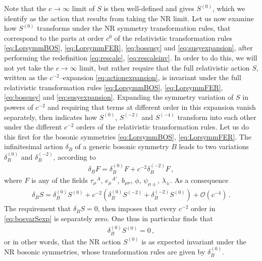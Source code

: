 \documentclass[a4paper,10pt,openany]{article}
\begin{document}
	Note that the $c \rightarrow \infty$ limit of $S$ is then well-defined and gives $S^{(0)}$, which we identify as the action that results from taking the NR limit. Let us now examine how $S^{(0)}$ transforms under the NR symmetry transformation rules, that correspond to the parts at order $c^0$ of the relativistic transformation rules \eqref{eq:LorsymmBOS}, \eqref{eq:LorsymmFER}, \eqref{eq:bossusy} and \eqref{eq:susyexpansion}, after performing the redefinition \eqref{eq:rescale}, \eqref{eq:rescaleinv}. In order to do this, we will not yet take the $c \rightarrow \infty$ limit, but rather require that the full relativistic action $S$, written as the $c^{-2}$--expansion \eqref{eq:actionexpansion}, is invariant under the full relativistic transformation rules \eqref{eq:LorsymmBOS}, \eqref{eq:LorsymmFER}, \eqref{eq:bossusy} and \eqref{eq:susyexpansion}. Expanding the symmetry variation of $S$ in powers of $c^{-2}$ and requiring that terms at different order in this expansion vanish separately, then indicates how $S^{(0)}$, $S^{(-2)}$ and $S^{(-4)}$ transform into each other under the different $c^{-2}$ orders of the relativistic transformation rules. Let us do this first for the bosonic symmetries \eqref{eq:LorsymmBOS}, \eqref{eq:LorsymmFER}. The infinitesimal action $\delta_B$ of a generic bosonic symmetry $B$ leads to two variations $\delta_B^{(0)}$ and $\delta_B^{(-2)}$, according to
	\begin{align}
		\delta_B F = \delta_B^{(0)} F + c^{-2} \delta_B^{(-2)} F \,,
	\end{align}
	where $F$ is any of the fields $\tau_\mu{}^A$, $e_\mu{}^{A'}$, $b_{\mu\nu}$, $\phi$, $\psi_{\mu\pm}$, $\lambda_\pm$. As a consequence
	\begin{align} \label{eq:bosvarSexp}
		\delta_B S = \delta_B^{(0)} S^{(0)} + c^{-2} \left( \delta_B^{(0)} S^{(-2)} + \delta_B^{(-2)} S^{(0)} \right)  + \mathcal{O}(c^{-4})\,.
	\end{align}
	The requirement that $\delta_B S = 0$, then imposes that every $c^{-2}$ order in \eqref{eq:bosvarSexp} is separately zero. One thus in particular finds that
	\begin{align}
		\delta_B^{(0)} S^{(0)} = 0 \,,
	\end{align}
	or in other words, that the NR action $S^{(0)}$ is as expected invariant under the NR bosonic symmetries, whose transformation rules are given by $\delta_B^{(0)}$.
	
\end{document}
